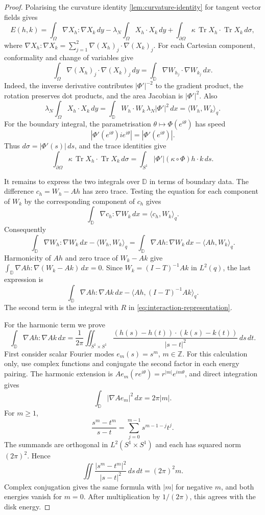 \begin{proof}
Polarising the curvature identity \cref{lem:curvature-identity}
for tangent vector fields gives
\[
 E(h,k)=\int_\Omega\nabla X_h:\nabla X_k\,dy
       -\lambda_N\int_\Omega X_h\cdot X_k\,dy
       +\int_{\partial\Omega}\kappa\,
                 \operatorname{Tr}X_h\cdot\operatorname{Tr}X_k\,d\sigma,
\]
where $\nabla X_h:\nabla X_k
=\sum_{j=1}^2\nabla(X_h)_j\cdot\nabla(X_k)_j$.
For each Cartesian component, conformality and change of variables
give
\[
 \int_\Omega\nabla(X_h)_j\cdot\nabla(X_k)_j\,dy
 =\int_{\mathbb D}\nabla W_{h_j}\cdot\nabla W_{k_j}\,dx.
\]
Indeed, the inverse derivative contributes $|\Phi'|^{-2}$ to the
gradient product, the rotation preserves dot products, and the
area Jacobian is $|\Phi'|^2$. Also
\[
 \lambda_N\int_\Omega X_h\cdot X_k\,dy
 =\int_{\mathbb D}W_h\cdot W_k\,\lambda_N|\Phi'|^2\,dx
 =\langle W_h,W_k\rangle_q.
\]
For the boundary integral, the parametrisation
$\theta\mapsto\Phi(e^{i\theta})$ has speed
\[
 |\Phi'(e^{i\theta})ie^{i\theta}|=|\Phi'(e^{i\theta})|.
\]
Thus $d\sigma=|\Phi'(s)|\,ds$, and the trace identities give
\[
 \int_{\partial\Omega}\kappa\,
           \operatorname{Tr}X_h\cdot\operatorname{Tr}X_k\,d\sigma
 =\int_{S^1}|\Phi'|(\kappa\circ\Phi)h\cdot k\,ds.
\]

It remains to express the two integrals over $\mathbb D$ in terms
of boundary data. The difference $c_h=W_h-Ah$ has zero trace.
Testing the equation for each component of $W_k$ by the corresponding
component of $c_h$ gives
\[
 \int_{\mathbb D}\nabla c_h:\nabla W_k\,dx
 =\langle c_h,W_k\rangle_q.
\]
Consequently
\[
 \int_{\mathbb D}\nabla W_h:\nabla W_k\,dx
       -\langle W_h,W_k\rangle_q
 =\int_{\mathbb D}\nabla Ah:\nabla W_k\,dx
       -\langle Ah,W_k\rangle_q.
\]
Harmonicity of $Ah$ and zero trace of $W_k-Ak$ give
$\int_{\mathbb D}\nabla Ah:\nabla(W_k-Ak)\,dx=0$.
Since $W_k=(I-T)^{-1}Ak$ in $L^2(q)$, the last expression is
\[
 \int_{\mathbb D}\nabla Ah:\nabla Ak\,dx
       -\langle Ah,(I-T)^{-1}Ak\rangle_q.
\]
The second term is the integral with $R$ in
\cref{eq:interaction-representation}.

For the harmonic term we prove
\begin{equation}\label{eq:harmonic-boundary-energy}
 \int_{\mathbb D}\nabla Ah:\nabla Ak\,dx
 =\frac1{2\pi}\iint_{S^1\times S^1}
       \frac{(h(s)-h(t))\cdot(k(s)-k(t))}{|s-t|^2}\,ds\,dt.
\end{equation}
First consider scalar Fourier modes $e_m(s)=s^m$, $m\in\mathbb Z$.
For this calculation only, use complex functions and conjugate the
second factor in each energy pairing. The harmonic extension is
$Ae_m(re^{i\theta})=r^{|m|}e^{im\theta}$, and direct integration
gives
\[
 \int_{\mathbb D}|\nabla Ae_m|^2\,dx=2\pi|m|.
\]
For $m\ge1$,
\[
 \frac{s^m-t^m}{s-t}=\sum_{j=0}^{m-1}s^{m-1-j}t^j.
\]
The summands are orthogonal in $L^2(S^1\times S^1)$ and each has
squared norm $(2\pi)^2$. Hence
\[
 \iint\frac{|s^m-t^m|^2}{|s-t|^2}\,ds\,dt=(2\pi)^2m.
\]
Complex conjugation gives the same formula with $|m|$ for negative
$m$, and both energies vanish for $m=0$. After multiplication by
$1/(2\pi)$, this agrees with the disk energy.


\end{proof}
